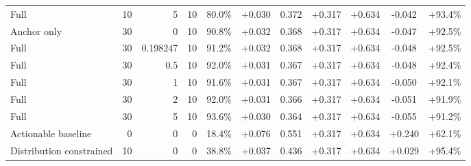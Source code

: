 \begin{table}[htbp]
\begin{tabular}{lrrrccccccc}
Full & 10 & 5 & 10 & 80.0\% & +0.030 & 0.372 & +0.317 & +0.634 & -0.042 & +93.4\% \\
Anchor only & 30 & 0 & 10 & 90.8\% & +0.032 & 0.368 & +0.317 & +0.634 & -0.047 & +92.5\% \\
Full & 30 & 0.198247 & 10 & 91.2\% & +0.032 & 0.368 & +0.317 & +0.634 & -0.048 & +92.5\% \\
Full & 30 & 0.5 & 10 & 92.0\% & +0.031 & 0.367 & +0.317 & +0.634 & -0.048 & +92.4\% \\
Full & 30 & 1 & 10 & 91.6\% & +0.031 & 0.367 & +0.317 & +0.634 & -0.050 & +92.1\% \\
Full & 30 & 2 & 10 & 92.0\% & +0.031 & 0.366 & +0.317 & +0.634 & -0.051 & +91.9\% \\
Full & 30 & 5 & 10 & 93.6\% & +0.030 & 0.364 & +0.317 & +0.634 & -0.055 & +91.2\% \\
Actionable baseline & 0 & 0 & 0 & 18.4\% & +0.076 & 0.551 & +0.317 & +0.634 & +0.240 & +62.1\% \\
Distribution constrained & 10 & 0 & 0 & 38.8\% & +0.037 & 0.436 & +0.317 & +0.634 & +0.029 & +95.4\% \\
\bottomrule
\end{tabular}
\end{table}